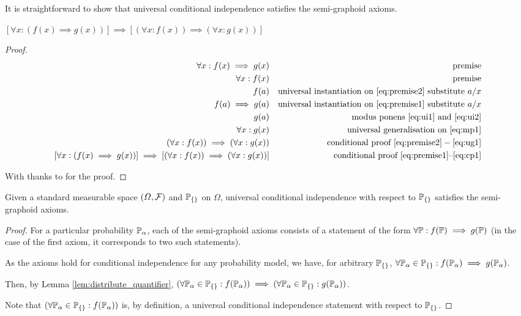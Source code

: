 It is straightforward to show that universal conditional independence satisfies the semi-graphoid axioms.

\begin{lemma}\label{lem:distribute_quantifier}
$[\forall x: (f(x)\implies g(x))]\implies[(\forall x: f(x))\implies(\forall x: g(x))]$
\end{lemma}

\begin{proof}
\begin{align}
	\forall x: f(x) \implies g(x)&&\text{premise}\label{eq:premise1}\\
	\forall x: f(x)&& \text{premise}\label{eq:premise2}\\
	f(a) && \text{universal instantiation on }\ref{eq:premise2}\text{ substitute }a/x\label{eq:ui1}\\
	f(a)\implies g(a) && \text{universal instantiation on }\ref{eq:premise1}\text{ substitute }a/x\label{eq:ui2}\\
	g(a)&&\text{ modus ponens }\ref{eq:ui1}\text{ and }\ref{eq:ui2}\label{eq:mp1}\\
	\forall x: g(x)&&\text{universal generalisation on }\ref{eq:mp1}\label{eq:ug1}\\
	(\forall x: f(x))\implies(\forall x: g(x))&& \text{conditional proof }\ref{eq:premise2}-\ref{eq:ug1}\label{eq:cp1}\\
	[\forall x: (f(x)\implies g(x))]\implies[(\forall x: f(x))\implies(\forall x: g(x))]&& \text{conditional proof }\ref{eq:premise1}\text{--}\ref{eq:cp1}
\end{align}

With thanks to \citet{1377555} for the proof.
\end{proof}

\begin{lemma}
Given a standard measurable space $(\Omega,\mathcal{F})$ and $\mathbb{P}_{\{\}}$ on $\Omega$, universal conditional independence with respect to $\mathbb{P}_{\{\}}$ satisfies the semi-graphoid axioms.
\end{lemma}

\begin{proof}
For a particular probability $\mathbb{P}_\alpha$, each of the semi-graphoid axioms consists of a statement of the form $\forall \mathbb{P}: f(\mathbb{P})\implies g(\mathbb{P})$ (in the case of the first axiom, it corresponds to two such statements).

As the axioms hold for conditional independence for any probability model, we have, for arbitrary $\mathbb{P}_{\{\}}$, $\forall \mathbb{P}_\alpha\in \mathbb{P}_{\{\}}: f(\mathbb{P}_{\alpha}) \implies g(\mathbb{P}_\alpha)$. 

Then, by Lemma \ref{lem:distribute_quantifier}, $(\forall \mathbb{P}_\alpha\in \mathbb{P}_{\{\}}: f(\mathbb{P}_{\alpha}))\implies (\forall \mathbb{P}_\alpha\in \mathbb{P}_{\{\}}: g(\mathbb{P}_{\alpha}))$.

Note that $(\forall \mathbb{P}_\alpha\in \mathbb{P}_{\{\}}: f(\mathbb{P}_{\alpha}))$ is, by definition, a universal conditional independence statement with respect to $\mathbb{P}_{\{\}}$.
\end{proof}

